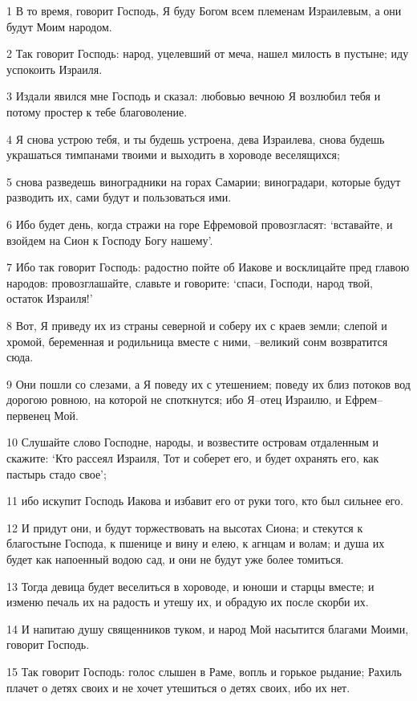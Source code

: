\par 1 В то время, говорит Господь, Я буду Богом всем племенам Израилевым, а они будут Моим народом.
\par 2 Так говорит Господь: народ, уцелевший от меча, нашел милость в пустыне; иду успокоить Израиля.
\par 3 Издали явился мне Господь и сказал: любовью вечною Я возлюбил тебя и потому простер к тебе благоволение.
\par 4 Я снова устрою тебя, и ты будешь устроена, дева Израилева, снова будешь украшаться тимпанами твоими и выходить в хороводе веселящихся;
\par 5 снова разведешь виноградники на горах Самарии; виноградари, которые будут разводить их, сами будут и пользоваться ими.
\par 6 Ибо будет день, когда стражи на горе Ефремовой провозгласят: `вставайте, и взойдем на Сион к Господу Богу нашему'.
\par 7 Ибо так говорит Господь: радостно пойте об Иакове и восклицайте пред главою народов: провозглашайте, славьте и говорите: `спаси, Господи, народ твой, остаток Израиля!'
\par 8 Вот, Я приведу их из страны северной и соберу их с краев земли; слепой и хромой, беременная и родильница вместе с ними, --великий сонм возвратится сюда.
\par 9 Они пошли со слезами, а Я поведу их с утешением; поведу их близ потоков вод дорогою ровною, на которой не споткнутся; ибо Я--отец Израилю, и Ефрем--первенец Мой.
\par 10 Слушайте слово Господне, народы, и возвестите островам отдаленным и скажите: `Кто рассеял Израиля, Тот и соберет его, и будет охранять его, как пастырь стадо свое';
\par 11 ибо искупит Господь Иакова и избавит его от руки того, кто был сильнее его.
\par 12 И придут они, и будут торжествовать на высотах Сиона; и стекутся к благостыне Господа, к пшенице и вину и елею, к агнцам и волам; и душа их будет как напоенный водою сад, и они не будут уже более томиться.
\par 13 Тогда девица будет веселиться в хороводе, и юноши и старцы вместе; и изменю печаль их на радость и утешу их, и обрадую их после скорби их.
\par 14 И напитаю душу священников туком, и народ Мой насытится благами Моими, говорит Господь.
\par 15 Так говорит Господь: голос слышен в Раме, вопль и горькое рыдание; Рахиль плачет о детях своих и не хочет утешиться о детях своих, ибо их нет.
